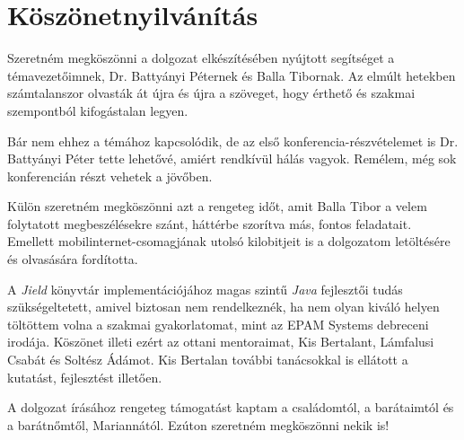\chapter*{Köszönetnyilvánítás}

Szeretném megköszönni a dolgozat elkészítésében nyújtott segítséget a témavezetőimnek, Dr. Battyányi Péternek és Balla Tibornak. Az elmúlt hetekben számtalanszor olvasták át újra és újra a szöveget, hogy érthető és szakmai szempontból kifogástalan legyen. 

Bár nem ehhez a témához kapcsolódik, de az első konferencia-részvételemet is Dr. Battyányi Péter tette lehetővé, amiért rendkívül hálás vagyok. Remélem, még sok konferencián részt vehetek a jövőben.

Külön szeretném megköszönni azt a rengeteg időt, amit Balla Tibor a velem folytatott megbeszélésekre szánt, háttérbe szorítva más, fontos feladatait. Emellett mobilinternet-csomagjának utolsó kilobitjeit is a dolgozatom letöltésére és olvasására fordította.

A \textit{Jield} könyvtár implementációjához magas szintű \textit{Java} fejlesztői tudás szükségeltetett, amivel biztosan nem rendelkeznék, ha nem olyan kiváló helyen töltöttem volna a szakmai gyakorlatomat, mint az EPAM Systems debreceni irodája. Köszönet illeti ezért az ottani mentoraimat, Kis Bertalant, Lámfalusi Csabát és Soltész Ádámot. Kis Bertalan további tanácsokkal is ellátott a kutatást, fejlesztést illetően.

A dolgozat írásához rengeteg támogatást kaptam a családomtól, a barátaimtól és a barátnőmtől, Mariannától. Ezúton szeretném megköszönni nekik is!
